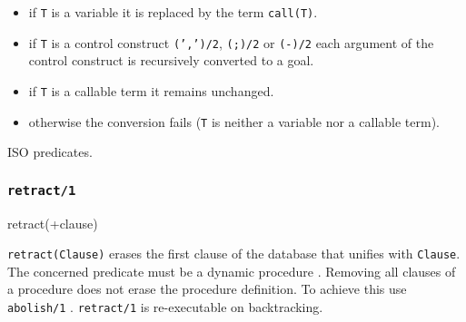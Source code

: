 
\begin{itemize}

\item if \texttt{T} is a variable it is replaced by the term
\texttt{call(T)}.

\item if \texttt{T} is a control construct \texttt{(',')/2}, \texttt{(;)/2}
or \texttt{(-{\gt})/2} each argument of the control construct is recursively
converted to a goal.

\item if \texttt{T} is a callable term it remains unchanged.

\item otherwise the conversion fails (\texttt{T} is neither a variable nor a
callable term).

\end{itemize}

\begin{PlErrors}





\end{PlErrors}

\Portability

ISO predicates.

\subsubsection{\texttt{retract/1}}

\begin{TemplatesOneCol}
retract(+clause)

\end{TemplatesOneCol}

\Description

\texttt{retract(Clause)} erases the first clause of the database
that unifies with \texttt{Clause}. The concerned predicate must be a
dynamic procedure
. Removing all clauses
of a procedure does not erase the procedure definition. To achieve
this use \texttt{abolish/1} . \texttt{retract/1} is
re-executable on backtracking.

